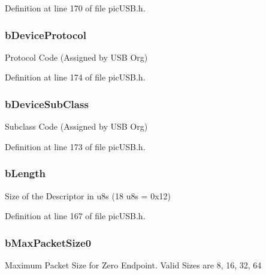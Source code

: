 Definition at line 170 of file pic\-U\-S\-B.\-h.

\hypertarget{struct_u_s_b___device___descriptor_a4dd44af3eaf7355f5699fc2fbf1bcb2f}{
\subsubsection[{b\-Device\-Protocol}]{ b\-Device\-Protocol}}\label{struct_u_s_b___device___descriptor_a4dd44af3eaf7355f5699fc2fbf1bcb2f}
Protocol Code (Assigned by U\-S\-B Org) 

Definition at line 174 of file pic\-U\-S\-B.\-h.

\hypertarget{struct_u_s_b___device___descriptor_a5082b67cfc876ba2828ed925b05c9f33}{
\subsubsection[{b\-Device\-Sub\-Class}]{ b\-Device\-Sub\-Class}}\label{struct_u_s_b___device___descriptor_a5082b67cfc876ba2828ed925b05c9f33}
Subclass Code (Assigned by U\-S\-B Org) 

Definition at line 173 of file pic\-U\-S\-B.\-h.

\hypertarget{struct_u_s_b___device___descriptor_a904ce9aea3e1db94a9a1ec5a0a22b65d}{
\subsubsection[{b\-Length}]{ b\-Length}}\label{struct_u_s_b___device___descriptor_a904ce9aea3e1db94a9a1ec5a0a22b65d}
Size of the Descriptor in u8s (18 u8s = 0x12) 

Definition at line 167 of file pic\-U\-S\-B.\-h.

\hypertarget{struct_u_s_b___device___descriptor_ad89d746ea974362fa15ab646fdcb5c61}{
\subsubsection[{b\-Max\-Packet\-Size0}]{ b\-Max\-Packet\-Size0}}\label{struct_u_s_b___device___descriptor_ad89d746ea974362fa15ab646fdcb5c61}
Maximum Packet Size for Zero Endpoint. Valid Sizes are 8, 16, 32, 64 

